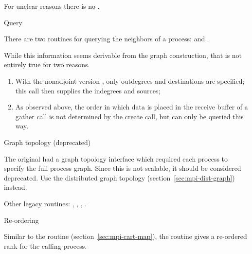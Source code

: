 For unclear reasons there is no .

 {Query}
\label{sec:graph-neighbors}

There are two routines for querying the neighbors of a process:
%
and
.

While this information seems derivable from the graph construction,
that is not entirely true for two reasons.
\begin{enumerate}
\item With the nonadjoint version ,
  only outdegrees and destinations are specified; this call then supplies
  the indegrees and sources;
\item As observed above, the order in which data is placed in the
  receive buffer of a gather call is not determined by the create call,
  but can only be queried this way.
\end{enumerate}

 {Graph topology (deprecated)}
\label{sec:mpi-1-graph}

The original  had a graph topology interface
which required each process to specify the full process graph. Since
this is not scalable, it should be considered deprecated. Use the
distributed graph topology (section~\ref{sec:mpi-dist-graph}) instead.

Other legacy routines: 
,
,
,
.

 {Re-ordering}

Similar to the  routine
(section~\ref{sec:mpi-cart-map}),
the routine  gives a re-ordered rank
for the calling process.

